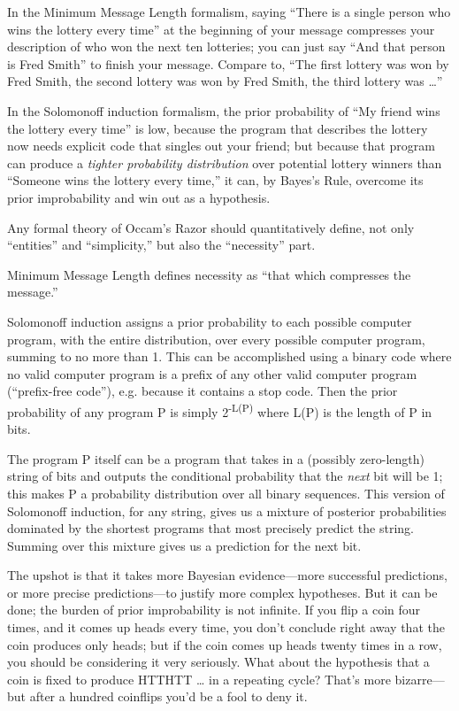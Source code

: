 {
 In the Minimum Message Length formalism, saying
``There is a single person who wins the lottery every
time'' at the beginning of your message compresses
your description of who won the next ten lotteries; you can just say
``And that person is Fred Smith'' to
finish your message. Compare to, ``The first lottery
was won by Fred Smith, the second lottery was won by Fred Smith, the
third lottery was \ldots''}

{
 In the Solomonoff induction formalism, the prior probability of
``My friend wins the lottery every
time'' is low, because the program that describes the
lottery now needs explicit code that singles out your friend; but
because that program can produce a \textit{tighter probability
distribution} over potential lottery winners than
``Someone wins the lottery every
time,'' it can, by Bayes's Rule,
overcome its prior improbability and win out as a hypothesis.}

{
 Any formal theory of Occam's Razor should
quantitatively define, not only
``entities'' and
``simplicity,'' but also the
``necessity'' part.}

{
 Minimum Message Length defines necessity as
``that which compresses the
message.''}

{
 Solomonoff induction assigns a prior probability to each possible
computer program, with the entire distribution, over every possible
computer program, summing to no more than 1. This can be accomplished
using a binary code where no valid computer program is a prefix of any
other valid computer program (``prefix-free
code''), e.g. because it contains a stop code. Then
the prior probability of any program P is simply
2\textsuperscript{{}-L(P)} where L(P) is the length of P in bits.}

{
 The program P itself can be a program that takes in a (possibly
zero-length) string of bits and outputs the conditional probability
that the \textit{next} bit will be 1; this makes P a probability
distribution over all binary sequences. This version of Solomonoff
induction, for any string, gives us a mixture of posterior
probabilities dominated by the shortest programs that most precisely
predict the string. Summing over this mixture gives us a prediction for
the next bit.}

{
 The upshot is that it takes more Bayesian evidence---more
successful predictions, or more precise predictions---to justify more
complex hypotheses. But it can be done; the burden of prior
improbability is not infinite. If you flip a coin four times, and it
comes up heads every time, you don't conclude right
away that the coin produces only heads; but if the coin comes up heads
twenty times in a row, you should be considering it very seriously.
What about the hypothesis that a coin is fixed to produce HTTHTT \ldots
in a repeating cycle? That's more bizarre---but after a
hundred coinflips you'd be a fool to deny it.}

